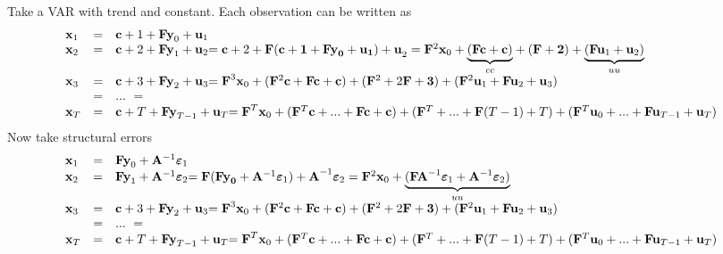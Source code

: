 \documentclass[11pt,a4paper]{report}
\numberwithin{equation}{chapter}
\numberwithin{section}{chapter}
\begin{document}
Take a VAR with trend and constant. Each observation can be written as%
\begin{equation*}
\begin{array}{lll}
\mathbf{x}_{1} & = & \mathbf{c}+1+\mathbf{Fy}_{0}+\mathbf{u}_{1} \\ 
\mathbf{x}_{2} & = & \mathbf{c}+2+\mathbf{Fy}_{1}+\mathbf{u}_{2}\mathbf{=%
\mathbf{c}}+2+\mathbf{F(\mathbf{c}}+\mathbf{1}+\mathbf{\mathbf{Fy}_{0}}+%
\mathbf{\mathbf{u}_{1})+u}_{2}=\mathbf{F}^{2}\mathbf{x}_{0}+\underset{cc}{%
\underbrace{(\mathbf{Fc}+\mathbf{c)}}}+(\mathbf{F}+\mathbf{2)}+\underset{uu}{%
\underbrace{(\mathbf{Fu}_{1}+\mathbf{u}_{2})}} \\ 
\mathbf{x}_{3} & = & \mathbf{c}+3+\mathbf{Fy}_{2}+\mathbf{u}_{3}\mathbf{=F}%
^{3}\mathbf{x}_{0}+(\mathbf{F}^{2}\mathbf{c}+\mathbf{Fc}+\mathbf{c)}+(%
\mathbf{F}^{2}+2\mathbf{F}+\mathbf{3)}+(\mathbf{F}^{2}\mathbf{u}_{1}+\mathbf{%
Fu}_{2}+\mathbf{u}_{3}) \\ 
& = & ...\ = \\ 
\mathbf{x}_{T} & = & \mathbf{c}+T+\mathbf{Fy}_{T-1}+\mathbf{u}_{T}\mathbf{=F}%
^{T}\mathbf{x}_{0}+(\mathbf{F}^{T}\mathbf{c}+...+\mathbf{Fc}+\mathbf{c)}+(%
\mathbf{F}^{T}+...+\mathbf{F(}T-1)+T\mathbf{)}+(\mathbf{F}^{T}\mathbf{u}%
_{0}+...+\mathbf{Fu}_{T-1}+\mathbf{u}_{T})%
\end{array}%
\end{equation*}%
Now take structural errors%
\begin{equation*}
\begin{array}{lll}
\mathbf{x}_{1} & = & \mathbf{Fy}_{0}+\mathbf{A}^{-1}\mathbf{\varepsilon }_{1}
\\ 
\mathbf{x}_{2} & = & \mathbf{Fy}_{1}+\mathbf{A}^{-1}\mathbf{\varepsilon }_{2}%
\mathbf{=F(\mathbf{Fy}_{0}}+\mathbf{A}^{-1}\mathbf{\varepsilon }_{1}\mathbf{%
)+A}^{-1}\mathbf{\varepsilon }_{2}=\mathbf{F}^{2}\mathbf{x}_{0}+\underset{uu}%
{\underbrace{(\mathbf{FA}^{-1}\mathbf{\varepsilon }_{1}+\mathbf{A}^{-1}%
\mathbf{\varepsilon }_{2})}} \\ 
\mathbf{x}_{3} & = & \mathbf{c}+3+\mathbf{Fy}_{2}+\mathbf{u}_{3}\mathbf{=F}%
^{3}\mathbf{x}_{0}+(\mathbf{F}^{2}\mathbf{c}+\mathbf{Fc}+\mathbf{c)}+(%
\mathbf{F}^{2}+2\mathbf{F}+\mathbf{3)}+(\mathbf{F}^{2}\mathbf{u}_{1}+\mathbf{%
Fu}_{2}+\mathbf{u}_{3}) \\ 
& = & ...\ = \\ 
\mathbf{x}_{T} & = & \mathbf{c}+T+\mathbf{Fy}_{T-1}+\mathbf{u}_{T}\mathbf{=F}%
^{T}\mathbf{x}_{0}+(\mathbf{F}^{T}\mathbf{c}+...+\mathbf{Fc}+\mathbf{c)}+(%
\mathbf{F}^{T}+...+\mathbf{F(}T-1)+T\mathbf{)}+(\mathbf{F}^{T}\mathbf{u}%
_{0}+...+\mathbf{Fu}_{T-1}+\mathbf{u}_{T})%
\end{array}%
\end{equation*}

\singlespacing{\small 


}
\end{document}
